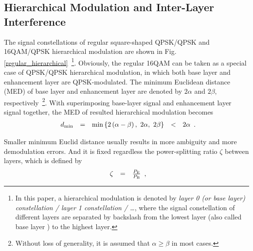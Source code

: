 \documentclass[10pt,fleqn, twocolumn]{IEEEtran}
\begin{document}
\subsection{Hierarchical Modulation and Inter-Layer Interference}

The signal constellations of regular square-shaped QPSK/QPSK and
16QAM/QPSK hierarchical modulation are shown in Fig.
\ref{regular_hierarchical}~\footnote{In this paper, a hierarchical
modulation is denoted by {\em layer 0 (or base layer)
constellation / layer 1 constellation / \ldots}, where the signal
constellation of different layers are separated by backslash from
the lowest layer (also called base layer ) to the highest layer.
}. Obviously, the regular 16QAM can be taken as a special case of
QPSK/QPSK hierarchical modulation, in which both base layer and
enhancement layer are QPSK-modulated. The minimum Euclidean
distance (MED) of base layer and enhancement layer are denoted by
$2\alpha$ and $2\beta$, respectively~\footnote{Without loss of
generality, it is assumed that $\alpha\geq\beta$ in most cases.}.
With superimposing base-layer signal and enhancement layer signal
together, the MED of resulted hierarchical modulation becomes
\begin{equation}
\begin{array}{rcccl}
d_{\rm min}& = & \min\left\{2\left(\alpha-\beta\right),\ 2\alpha,\
2\beta\right\}&<& 2\alpha
\end{array}.\label{Regular_MED}
\end{equation}
\begin{figure}
\end{figure}
\noindent Smaller minimum Euclid distance usually results in more
ambiguity and more demodulation errors.
And it is fixed regardless
the power-splitting ratio $\zeta$ between layers, which is defined
by
\begin{equation}
\begin{array}{rcl}
\zeta& = & \frac{P_{\rm E}}{P_{\rm B}}
\end{array},\label{power_ratio}
\end{equation}
\end{document}
